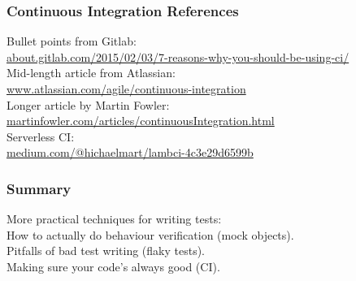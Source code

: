 \documentclass{beamer}
\newenvironment{changemargin}[1]{%
  \begin{list}{}{%
    \setlength{\topsep}{0pt}%
    \setlength{\leftmargin}{#1}%
    \setlength{\rightmargin}{1em}
    \setlength{\listparindent}{\parindent}%
    \setlength{\itemindent}{\parindent}%
    \setlength{\parsep}{\parskip}%
  }%
  \item[]}{\end{list}}
\begin{document}
\begin{frame}
  \frametitle{Continuous Integration References}

  \begin{changemargin}{1cm}
    Bullet points from Gitlab: \\
    \url{about.gitlab.com/2015/02/03/7-reasons-why-you-should-be-using-ci/}\\[1em]
    Mid-length article from Atlassian: \\
\url{www.atlassian.com/agile/continuous-integration}\\[1em]
    Longer article by Martin Fowler: \\
    \url{martinfowler.com/articles/continuousIntegration.html}\\[2em]
    Serverless CI: \\
    \url{medium.com/@hichaelmart/lambci-4c3e29d6599b}
  \end{changemargin}
\end{frame}



\begin{frame}
  \frametitle{Summary}
  \Large
  \begin{changemargin}{1cm}
    More practical techniques for writing tests:\\[1em]

    How to actually do behaviour verification (mock objects).\\
    Pitfalls of bad test writing (flaky tests).\\
    Making sure your code's always good (CI).\\

  \end{changemargin}
\end{frame}
\end{document}
